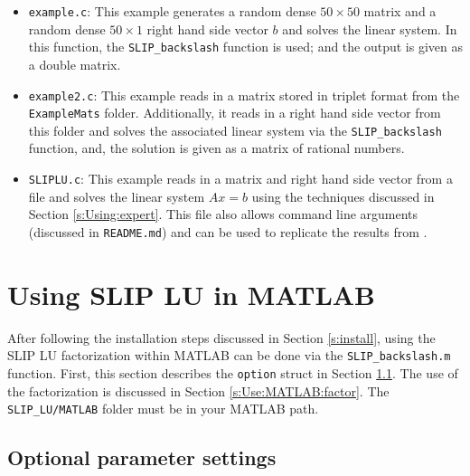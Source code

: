 \documentclass[12pt]{article}
\theoremstyle{definition}
\begin{document}
\begin{itemize}
\item \verb|example.c|: This example generates a random dense $50 \times 50$
matrix and a random dense $50 \times 1$ right hand side vector $b$ and
solves the linear system. In this function, the \verb|SLIP_backslash|
function is used; and the output is given as a double matrix.

\item \verb|example2.c|: This example reads in a matrix stored in triplet
format from the \verb|ExampleMats| folder. Additionally, it reads in a
right hand side vector from this folder and solves the associated linear system
via the \verb|SLIP_backslash| function, and, the solution is given as a matrix
of rational numbers.

\item \verb|SLIPLU.c|: This example reads in a matrix and right hand side
vector from a file and solves the linear system $A x = b$
using the techniques discussed in Section \ref{s:Using:expert}. This file also
allows command line arguments (discussed in \verb|README.md|) and can be used
to replicate the results from \cite{lourenco2019exact}.

\end{itemize}

\newpage
\cprotect\section{Using SLIP LU in MATLAB}
\label{s:Use:MATLAB}

After following the installation steps discussed in Section \ref{s:install},
using the SLIP LU factorization within MATLAB can be done via the
\verb|SLIP_backslash.m| function. First, this section describes the
\verb|option| struct in Section \ref{s:Use:MATLAB:setup}.
The use of the factorization is discussed in Section \ref{s:Use:MATLAB:factor}.
The \verb|SLIP_LU/MATLAB| folder must be in your MATLAB path.

\cprotect\subsection{Optional parameter settings}
\label{s:Use:MATLAB:setup}
\end{document}
